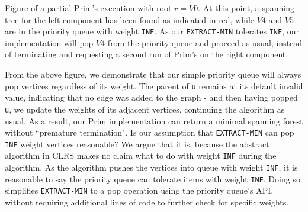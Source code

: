 \newline
\begin{center}
\newline
Figure of a partial Prim's execution with root $r = V0$. At this point, a spanning tree for the left component has been found as indicated in red, while $V4$ and $V5$ are in the priority queue with weight \texttt{INF}. As our \texttt{EXTRACT-MIN} tolerates \texttt{INF}, our implementation will pop $V4$ from the priority queue and proceed as usual, instead of terminating and requesting a second run of Prim's on the right component.
\newline
\end{center}
From the above figure, we demonstrate that our simple priority queue will always pop vertices regardless of its weight. The parent of \texttt{u} remains at its default invalid value, indicating that no edge was added to the graph - and then having popped \texttt{u}, we update the weights of its adjacent vertices, continuing the algorithm as usual. As a result, our Prim implementation can return a minimal spanning forest without ``premature termination".
\newline\newline
Is our assumption that \texttt{EXTRACT-MIN} can pop \texttt{INF} weight vertices reasonable? We argue that it is, because the abstract algorithm in CLRS makes no claim what to do with weight \texttt{INF} during the algorithm. As the algorithm pushes the vertices into queue with weight \texttt{INF}, it is reasonable to say the priority queue can tolerate items with weight \texttt{INF}. Doing so simplifies \texttt{EXTRACT-MIN} to a pop operation using the priority queue's API, without requiring additional lines of code to further check for specific weights.
